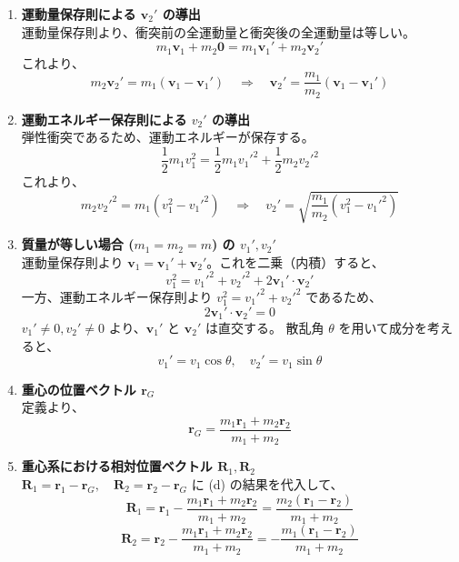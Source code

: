 \documentclass[a4paper,12pt]{jlreq}
\begin{document}
\begin{enumerate}[label=(\alph*)]
    \item \textbf{運動量保存則による $\bm{v}_2'$ の導出} \\
    運動量保存則より、衝突前の全運動量と衝突後の全運動量は等しい。
    \[
    m_1 \bm{v}_1 + m_2 \bm{0} = m_1 \bm{v}_1' + m_2 \bm{v}_2'
    \]
    これより、
    \[
    m_2 \bm{v}_2' = m_1 (\bm{v}_1 - \bm{v}_1') \quad \Longrightarrow \quad \bm{v}_2' = \frac{m_1}{m_2}(\bm{v}_1 - \bm{v}_1')
    \]

    \item \textbf{運動エネルギー保存則による $v_2'$ の導出} \\
    弾性衝突であるため、運動エネルギーが保存する。
    \[
    \frac{1}{2}m_1 v_1^2 = \frac{1}{2}m_1 v_1'^2 + \frac{1}{2}m_2 v_2'^2
    \]
    これより、
    \[
    m_2 v_2'^2 = m_1 (v_1^2 - v_1'^2) \quad \Longrightarrow \quad v_2' = \sqrt{\frac{m_1}{m_2}(v_1^2 - v_1'^2)}
    \]

    \item \textbf{質量が等しい場合 ($m_1 = m_2 = m$) の $v_1', v_2'$} \\
    運動量保存則より $\bm{v}_1 = \bm{v}_1' + \bm{v}_2'$。これを二乗（内積）すると、
    \[
    v_1^2 = v_1'^2 + v_2'^2 + 2\bm{v}_1' \cdot \bm{v}_2'
    \]
    一方、運動エネルギー保存則より $v_1^2 = v_1'^2 + v_2'^2$ であるため、
    \[
    2\bm{v}_1' \cdot \bm{v}_2' = 0
    \]
    $v_1' \ne 0, v_2' \ne 0$ より、$\bm{v}_1'$ と $\bm{v}_2'$ は直交する。
    散乱角 $\theta$ を用いて成分を考えると、
    \[
    v_1' = v_1 \cos \theta, \quad v_2' = v_1 \sin \theta
    \]

    \item \textbf{重心の位置ベクトル $\bm{r}_G$} \\
    定義より、
    \[
    \bm{r}_G = \frac{m_1 \bm{r}_1 + m_2 \bm{r}_2}{m_1 + m_2}
    \]

    \item \textbf{重心系における相対位置ベクトル $\bm{R}_1, \bm{R}_2$} \\
    $\bm{R}_1 = \bm{r}_1 - \bm{r}_G, \quad \bm{R}_2 = \bm{r}_2 - \bm{r}_G$ に (d) の結果を代入して、
    \[
    \bm{R}_1 = \bm{r}_1 - \frac{m_1 \bm{r}_1 + m_2 \bm{r}_2}{m_1 + m_2} = \frac{m_2 (\bm{r}_1 - \bm{r}_2)}{m_1 + m_2}
    \]
    \[
    \bm{R}_2 = \bm{r}_2 - \frac{m_1 \bm{r}_1 + m_2 \bm{r}_2}{m_1 + m_2} = -\frac{m_1 (\bm{r}_1 - \bm{r}_2)}{m_1 + m_2}
    \]


\end{enumerate}
\end{document}

